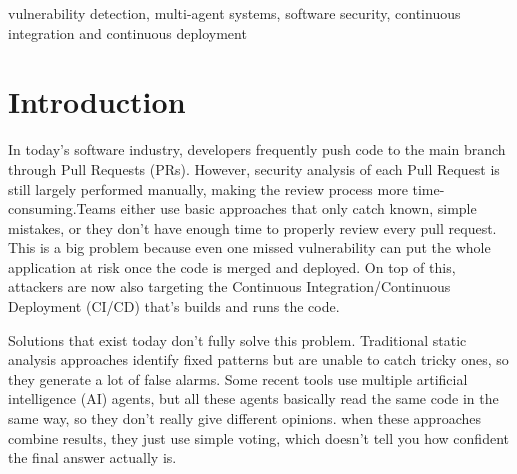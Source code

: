 \documentclass[conference]{IEEEtran}
\begin{document}
\begin{abstract}
Modern software development increasingly relies
on Continuous Integration/Continuous Deployment (CI/CD) pipelines to deliver software rapidly, but automated
security review at the pull request stage remains limited. Existing
security tools rely on rigid static analysis or homogeneous multi-
agent approaches, which may generate false positives or overlook
complex vulnerabilities. This project will present CodeSheriff, an
agentic security auditor that will analyze GitHub pull requests
using structural, semantic, contextual, and SFI-based confidential
execution analysis. A Bayesian inference engine will fuse evidence
from multiple agents to generate confidence-aware vulnerability
assessments, while an automated patch generation and verifica-
tion module will recommend and validate fixes through GitHub
and a web dashboard. The system will enhance CI/CD security
by delivering reliable, explainable, and statistically grounded
vulnerability detection while reducing manual review effort.
\end{abstract}
\vspace{6pt}
\begin{IEEEkeywords}
vulnerability detection, multi-agent systems, software security,
continuous integration and continuous deployment
\end{IEEEkeywords}


\section{Introduction}
In today’s software industry, developers frequently push code to the main branch through Pull Requests (PRs). However, security analysis of each Pull Request is still largely performed manually, making the review process more time-consuming.Teams either use basic approaches that only catch known, simple mistakes, or they don't have enough time to properly review every pull request. This is a big problem because even one missed vulnerability can put the whole application at risk once the code is merged and deployed. On top of this, attackers are now also targeting the Continuous Integration/Continuous Deployment (CI/CD) that's builds and runs the code.

Solutions that exist today don’t fully solve this problem. Traditional static analysis approaches identify fixed patterns but are unable to catch tricky ones, so they generate a lot of false alarms. Some recent tools use multiple artificial intelligence (AI) agents, but all these agents basically read the same code in the same way, so they don't really give different opinions. when these approaches combine results, they just use simple voting, which doesn't tell you how confident the final answer actually is.
\end{document}
